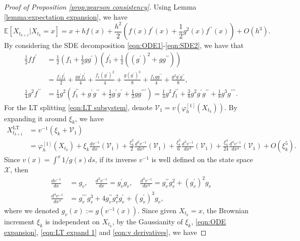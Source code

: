 \documentclass[a4paper,12pt]{article}
\numberwithin{equation}{section}
\theoremstyle{plain}
\theoremstyle{definition}
\begin{document}
\begin{appendix}
\begin{proof}[Proof of Proposition \ref{prop:pearson consistency}]
Using Lemma \ref{lemma:expectation expansion}, we have
\begin{equation}\label{eqn:x expectation}
    \mathbb{E}[X_{t_{k+1}}|X_{t_k}=x]=x+hf(x)+\frac{h^2}{2}(f(x)f^{\prime}(x)+\frac{1}{2}g^2(x)f^{\prime \prime}(x))+O(h^3).
\end{equation}
By considering the SDE decomposition \eqref{eqn:ODE1}-\eqref{eqn:SDE2}, we have that
\begin{align}
    \frac{1}{2}ff^{\prime}&=\frac{1}{2}(f_1+\frac{1}{2}gg^{\prime})(f_1^{\prime}+\frac{1}{2}((g^{\prime})^2+gg^{\prime\prime}))\nonumber\\
    &=\frac{f_1f_1^{\prime}}{2}+\frac{gg^{\prime}f_1^{\prime}}{4}+\frac{f_1(g^{\prime})^2}{4}+\frac{g(g^{\prime})^3}{8}+\frac{f_1gg^{\prime\prime}}{4}+\frac{g^2g^{\prime}g^{\prime\prime}}{8}\label{eqn:f fprime},\\
    \frac{1}{4}g^2f^{\prime\prime}&=\frac{1}{4}g^2(f_1^{\prime \prime}+g^{\prime} g^{\prime \prime}+\frac{1}{2} g^{\prime} g^{\prime}+\frac{1}{2} g g^{\prime \prime \prime})=\frac{1}{4} g^2 f_1^{\prime \prime}+\frac{3}{8} g^2 g^{\prime} g^{\prime \prime}+\frac{1}{8} g^3 g^{\prime \prime \prime}.\label{eqn:g square fpp}
\end{align}
For the LT splitting \eqref{eqn:LT subsystem}, denote $\mathcal{V}_1=v\left(\varphi_h^{[1]}(X_{t_k})\right)$. By expanding it around $\xi_k$, we have
\begin{align}
X^{\textrm{LT}}_{t_{k+1}}&=v^{-1}(\xi_{k}+\mathcal{V}_1)\nonumber\\
    &=\varphi_h^{[1]}(X_{t_{k}})+\xi_k\frac{d v^{-1}}{d x}(\mathcal{V}_1)+\frac{\xi_k^2}{2}\frac{d^2v^{-1}}{dx^2}(\mathcal{V}_1)+\frac{\xi_k^3}{6}\frac{d^3 v^{-1}}{d x^3} (\mathcal{V}_1)+\frac{\xi_k^4}{24}\frac{d^4 v^{-1}}{d x^4} (\mathcal{V}_1)+O(\xi_k^5).\label{eqn:LT expand 1}
\end{align}
Since $v(x)=\int^x 1/{g(s)}ds$, if its inverse $v^{-1}$ is well defined on the state space $\mathcal{X}$, then
\begin{align}
    \frac{d v^{-1}}{d x}&=g_v,\quad \frac{d^2 v^{-1}}{d x}=g^{\prime}_vg_v,\quad \frac{d^3 v^{-1}}{dx^3}=g^{\prime \prime}_vg^2_v+(g^{\prime}_v)^2g_v\label{eqn:v derivatives}\\
    \frac{d^4 v^{-1}}{dx^4}&=g^{\prime\prime\prime}_vg^3_v+4g^{\prime\prime}_vg^2_vg^{\prime}_v+(g^{\prime}_v)^3g_v\nonumber,
\end{align}
where we denoted $g_v(x):=g(v^{-1}(x))$. 
Since given $X_{t_k}=x$, the Brownian increment $\xi_k$ is independent on $X_{t_k}$, by the Gaussianity of $\xi_k$, \eqref{eqn:ODE expansion},  \eqref{eqn:LT expand 1} and \eqref{eqn:v derivatives}, we have

\end{proof}
\end{appendix}
\end{document}
